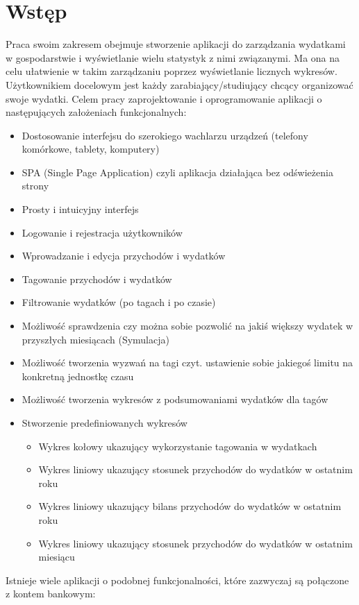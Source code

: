 \documentclass[10pt,titlepage]{article}
\begin{document}
\section*{Wstęp}
Praca swoim zakresem obejmuje stworzenie aplikacji do zarządzania wydatkami w gospodarstwie \linebreak i wyświetlanie wielu statystyk z nimi związanymi. Ma ona na celu ułatwienie w takim zarządzaniu poprzez wyświetlanie licznych wykresów. Użytkownikiem docelowym jest każdy zarabiający/studiujący chcący organizować swoje wydatki. Celem pracy zaprojektowanie i oprogramowanie aplikacji o następujących założeniach funkcjonalnych:
\begin{itemize}
  \item Dostosowanie interfejsu do szerokiego wachlarzu urządzeń (telefony komórkowe, tablety, komputery)
  \item SPA (Single Page Application) czyli aplikacja działająca bez odświeżenia strony
  \item Prosty i intuicyjny interfejs
  \item Logowanie i rejestracja użytkowników
  \item Wprowadzanie i edycja przychodów i wydatków
  \item Tagowanie przychodów i wydatków
  \item Filtrowanie wydatków (po tagach i po czasie)
  \item Możliwość sprawdzenia czy można sobie pozwolić na jakiś większy wydatek w przyszłych miesiącach (Symulacja)
  \item Możliwość tworzenia wyzwań na tagi czyt. ustawienie sobie jakiegoś limitu na konkretną jednostkę czasu
  \item Możliwość tworzenia wykresów z podsumowaniami wydatków dla tagów
  \item Stworzenie predefiniowanych wykresów
    \begin{itemize}
      \item Wykres kołowy ukazujący wykorzystanie tagowania w wydatkach
      \item Wykres liniowy ukazujący stosunek przychodów do wydatków w ostatnim roku
      \item Wykres liniowy ukazujący bilans przychodów do wydatków w ostatnim roku
      \item Wykres liniowy ukazujący stosunek przychodów do wydatków w ostatnim miesiącu
    \end{itemize}
\end{itemize}
Istnieje wiele aplikacji o podobnej funkcjonalności, które zazwyczaj są połączone z kontem bankowym:
\end{document}
